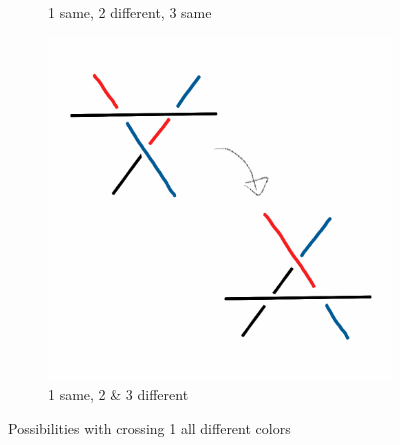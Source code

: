 \documentclass[12pt,letterpaper]{article}
\theoremstyle{definition}
\begin{document}
\begin{figure}[h!]
\begin{subfigure}{.3\textwidth}
        \caption{1 same, 2 different, 3 same}
    \end{subfigure}
    \quad
    \begin{subfigure}{.3\textwidth}
        \centering
        \includegraphics[width=\textwidth]{knotpics/1d2d3d.png}
        \caption{1 same, 2 \& 3 different}
    \end{subfigure}
    \caption{Possibilities with crossing 1 all different colors}
\end{figure}
\end{document}
